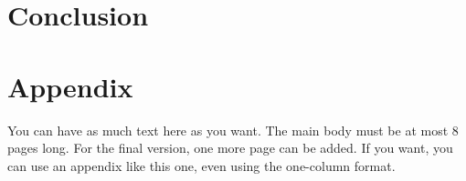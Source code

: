 \documentclass[nohyperref]{article}
\theoremstyle{plain}
\theoremstyle{definition}
\theoremstyle{remark}
\begin{document}
\section{Conclusion}








\newpage
\appendix
\onecolumn
\section{Appendix}

You can have as much text here as you want. The main body must be at most $8$ pages long.
For the final version, one more page can be added.
If you want, you can use an appendix like this one, even using the one-column format.
\end{document}
